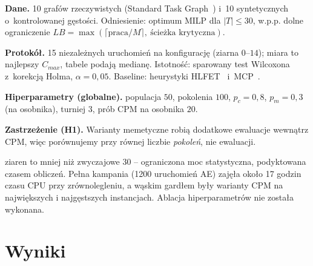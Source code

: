 \documentclass[12pt,a4paper]{article}
\begin{document}
\noindent\textbf{Dane.} 10 grafów rzeczywistych (Standard Task Graph~\cite{tobita2002}) i~10
syntetycznych o~kontrolowanej gęstości. Odniesienie: optimum MILP dla $|T|\le 30$, w.p.p. dolne
ograniczenie $LB=\max(\lceil \text{praca}/M\rceil,\ \text{ścieżka krytyczna})$.

\noindent\textbf{Protokół.} 15 niezależnych uruchomień na konfigurację (ziarna $0$--$14$); miara to
najlepszy $C_{max}$, tabele podają medianę. Istotność: sparowany test Wilcoxona~\cite{wilcoxon1945}
z~korekcją Holma, $\alpha=0{,}05$. Baseline: heurystyki HLFET~\cite{adam1974} i~MCP~\cite{wu1990}.

\noindent\textbf{Hiperparametry (globalne).} populacja $50$, pokolenia $100$, $p_c=0{,}8$,
$p_m=0{,}3$ (na osobnika), turniej $3$, prób CPM na osobnika $20$.

\noindent\textbf{Zastrzeżenie (H1).} Warianty memetyczne robią dodatkowe ewaluacje wewnątrz CPM,
więc porównujemy przy równej liczbie \emph{pokoleń}, nie ewaluacji.

 ziaren to mniej niż zwyczajowe 30 -- ograniczona moc statystyczna, podyktowana czasem
obliczeń. Pełna kampania (1200 uruchomień AE) zajęła około 17 godzin czasu CPU przy zrównolegleniu,
a wąskim gardłem były warianty CPM na największych i najgęstszych instancjach. Ablacja
hiperparametrów nie została wykonana.

\section{Wyniki}
\label{sec:wyniki}
\end{document}
